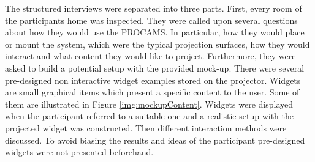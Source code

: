 The structured interviews were separated into three parts. First, every room of the participants home was inspected. They were called upon several questions about how they would use the \ac{PROCAMS}. In particular, how they would place or mount the system, which were the typical projection surfaces, how they would interact and what content they would like to project. Furthermore, they were asked to build a potential setup with the provided mock-up. There were several pre-designed non interactive widget examples stored on the projector. Widgets are small graphical items which present a specific content to the user. Some of them are illustrated in Figure \ref{img:mockupContent}.
Widgets were displayed when the participant referred to a suitable one and a realistic setup with the projected widget was constructed.
Then different interaction methods were discussed. To avoid biasing the results and ideas of the participant pre-designed widgets were not presented beforehand.

